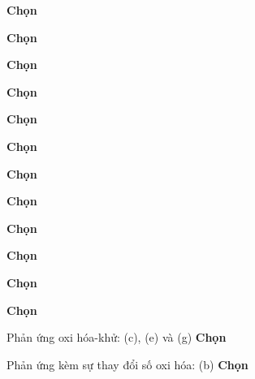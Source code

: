 \begin{loigiaiex}{15}
  \phantom {a}\hfill {\bfseries \sffamily Chọn~} 
\end{loigiaiex}
\begin{loigiaiex}{16}
  \phantom {a}\hfill {\bfseries \sffamily Chọn~} 
\end{loigiaiex}
\begin{loigiaiex}{17}
  \phantom {a}\hfill {\bfseries \sffamily Chọn~} 
\end{loigiaiex}
\begin{loigiaiex}{18}
  \phantom {a}\hfill {\bfseries \sffamily Chọn~} 
\end{loigiaiex}
\begin{loigiaiex}{19}
  \phantom {a}\hfill {\bfseries \sffamily Chọn~} 
\end{loigiaiex}
\begin{loigiaiex}{20}
  \phantom {a}\hfill {\bfseries \sffamily Chọn~} 
\end{loigiaiex}
\begin{loigiaiex}{21}
  \phantom {a}\hfill {\bfseries \sffamily Chọn~} 
\end{loigiaiex}
\begin{loigiaiex}{22}
  \phantom {a}\hfill {\bfseries \sffamily Chọn~} 
\end{loigiaiex}
\begin{loigiaiex}{23}
  \phantom {a}\hfill {\bfseries \sffamily Chọn~} 
\end{loigiaiex}
\begin{loigiaiex}{24}
  \phantom {a}\hfill {\bfseries \sffamily Chọn~} 
\end{loigiaiex}
\begin{loigiaiex}{25}
  \phantom {a}\hfill {\bfseries \sffamily Chọn~} 
\end{loigiaiex}
\begin{loigiaiex}{26}
  \phantom {a}\hfill {\bfseries \sffamily Chọn~} 
\end{loigiaiex}
\begin{loigiaiex}{27}
 Phản ứng oxi hóa-khử: (c), (e) và (g) \phantom {a}\hfill {\bfseries \sffamily Chọn~} 
\end{loigiaiex}
\begin{loigiaiex}{28}
  Phản ứng kèm sự thay đổi số oxi hóa: (b)  \phantom {a}\hfill {\bfseries \sffamily Chọn~} 
\end{loigiaiex}

